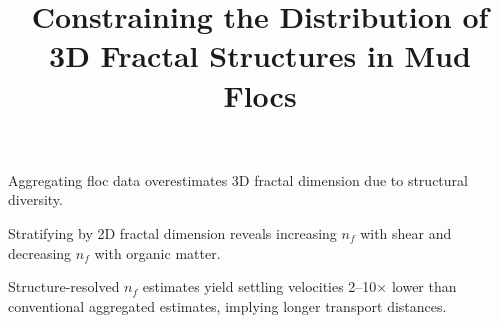 \documentclass{agujournal2019}
\begin{document}
\title{Constraining the Distribution of 3D Fractal Structures in Mud Flocs}




\begin{keypoints}
\item Aggregating floc data overestimates 3D fractal dimension due to structural diversity.
\item Stratifying by 2D fractal dimension reveals increasing $n_f$ with shear and decreasing $n_f$ with organic matter.
\item Structure-resolved $n_f$ estimates yield settling velocities 2--10$\times$ lower than conventional aggregated estimates, implying longer transport distances.
\end{keypoints}
\end{document}
